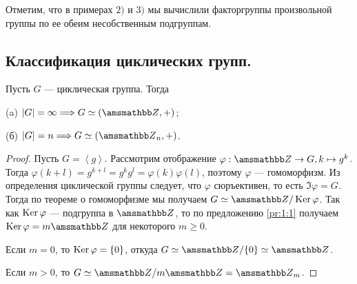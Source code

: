 \vspace{0.4cm}

Отметим, что в примерах $2)$ и $3)$ мы вычислили факторгруппы
произвольной группы по ее обеим несобственным подгруппам.


\newpage
\mysection
\subsection{Классификация циклических групп.}


\begin{proposal}
    Пусть $G$ --- циклическая группа. Тогда

    (a) $|G| = \infty \To G \simeq (\ZZ, +)$;

    (б) $|G| = n \To G \simeq (\ZZ_n, +)$.
\end{proposal}

\begin{proof}
    Пусть $G = \left< g \right>$. Рассмотрим отображение 
    $\varphi: \ZZ \to G, k \mapsto g^{k}$.
    Тогда $\varphi(k + l) = g^{k + l} = g^kg^l = \varphi(k)\varphi(l)$,
    поэтому $\varphi$ --- гомоморфизм. Из определения циклической группы следует,
    что $\varphi$ сюръективен, то есть $\Im \varphi = G$. Тогда по теореме о
    гомоморфизме мы получаем $G \simeq \ZZ / \Ker \varphi$.
    Так как $\operatorname{Ker} \varphi$ --- подгруппа в $\ZZ$, то по предложению 
    \ref{pr:1:1} получаем $\Ker \varphi = m\ZZ$ для некоторого 
    $m \geq 0$. 
    
    Если $m = 0$, то 
    $\operatorname{Ker} \varphi = \{0\}$, откуда $G \simeq \ZZ / \{0\} \simeq \ZZ$.
    
    Если $m > 0$, то $G \simeq \ZZ / m\ZZ = \ZZ_m$.
\end{proof}